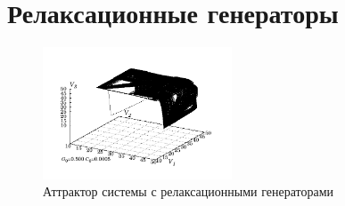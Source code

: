 
\FloatBarrier
\section{Релаксационные генераторы}  %
\label{atu:sect:relax}


\begin{figure}[htb!]
\centerline{\includegraphics[width=0.5\textwidth]{p/cha/relax_phase3_0500.pdf} }
\caption{Аттрактор системы с релаксационными генераторами}
\label{atu:f:relax_phase3}
\end{figure}


